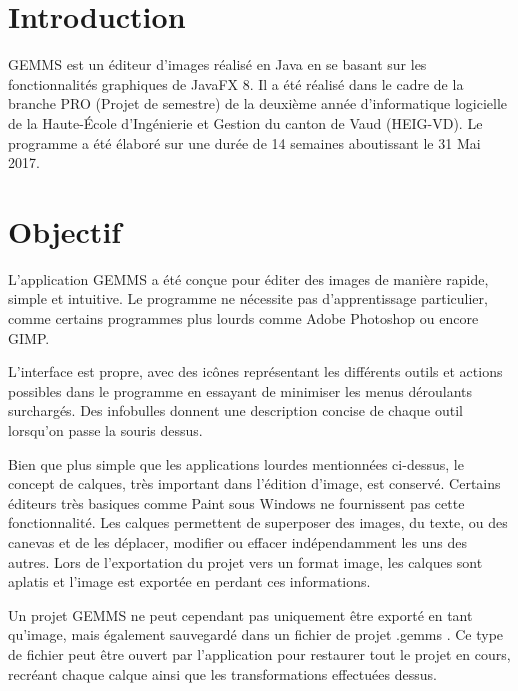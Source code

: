 \section{Introduction}
GEMMS est un éditeur d'images réalisé en Java en se basant sur les fonctionnalités graphiques de JavaFX 8. Il a été réalisé dans le cadre de la branche PRO (Projet de semestre) de la deuxième année d'informatique logicielle de la Haute-École d'Ingénierie et Gestion du canton de Vaud (HEIG-VD). 
Le programme a été élaboré sur une durée de 14 semaines aboutissant le 31 Mai 2017.

\section{Objectif}
L'application GEMMS a été conçue pour éditer des images de manière rapide, simple et intuitive. Le programme ne nécessite pas d'apprentissage particulier, comme certains programmes plus lourds comme Adobe Photoshop ou encore GIMP.

L'interface est propre, avec des icônes représentant les différents outils et actions possibles dans le programme en essayant de minimiser les menus déroulants surchargés. Des infobulles donnent une description concise de chaque outil lorsqu'on passe la souris dessus.

Bien que plus simple que les applications lourdes mentionnées ci-dessus, le concept de calques, très important dans l'édition d'image, est conservé. Certains éditeurs très basiques comme Paint sous Windows ne fournissent pas cette fonctionnalité. Les calques permettent de superposer des images, du texte, ou des canevas et de les déplacer, modifier ou effacer indépendamment les uns des autres. Lors de l'exportation du projet vers un format image, les calques sont aplatis et l'image est exportée en perdant ces informations.

Un projet GEMMS ne peut cependant pas uniquement être exporté en tant qu'image, mais également sauvegardé dans un fichier de projet \og.gemms \fg{}. Ce type de fichier peut être ouvert par l'application pour restaurer tout le projet en cours, recréant chaque calque ainsi que les transformations effectuées dessus.

